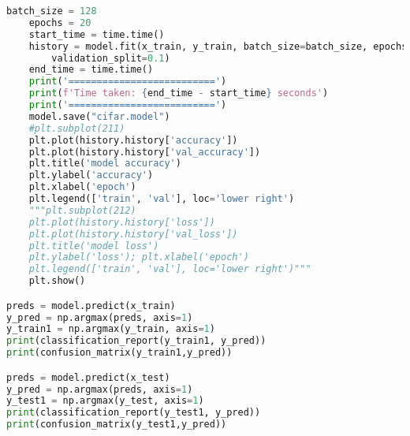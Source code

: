 \documentclass[12pt]{article}
\begin{document}
\begin{lstlisting}[language=Python]
	batch_size = 128
	epochs = 20
	start_time = time.time()
	history = model.fit(x_train, y_train, batch_size=batch_size, epochs=epochs,
	    validation_split=0.1)
	end_time = time.time()
	print('==========================')
	print(f'Time taken: {end_time - start_time} seconds')
	print('==========================')
	model.save("cifar.model")
	#plt.subplot(211)
	plt.plot(history.history['accuracy'])
	plt.plot(history.history['val_accuracy'])
	plt.title('model accuracy')
	plt.ylabel('accuracy')
	plt.xlabel('epoch')
	plt.legend(['train', 'val'], loc='lower right')
	"""plt.subplot(212)
	plt.plot(history.history['loss'])
	plt.plot(history.history['val_loss'])
	plt.title('model loss')
	plt.ylabel('loss'); plt.xlabel('epoch')
	plt.legend(['train', 'val'], loc='lower right')"""
	plt.show()

preds = model.predict(x_train)
y_pred = np.argmax(preds, axis=1)
y_train1 = np.argmax(y_train, axis=1)
print(classification_report(y_train1, y_pred))
print(confusion_matrix(y_train1,y_pred))

preds = model.predict(x_test)
y_pred = np.argmax(preds, axis=1)
y_test1 = np.argmax(y_test, axis=1)
print(classification_report(y_test1, y_pred))
print(confusion_matrix(y_test1,y_pred))
\end{lstlisting}
\end{document}
